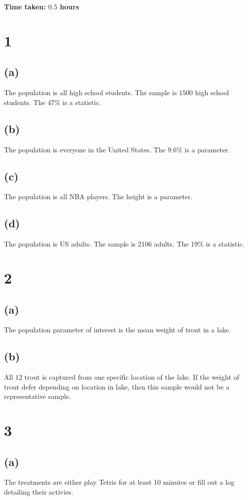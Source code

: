 \documentclass[10pt]{article}
\begin{document}
\noindent
\textbf{Time taken: $0.5$ hours}

\section*{1}

\subsection*{(a)}
The population is all high school students. The sample is $1500$ high school students. The $47\%$ is a statistic.

\subsection*{(b)}
The population is everyone in the United States. The $9.6\%$ is a parameter.

\subsection*{(c)}
The population is all NBA players. The height is a parameter.

\subsection*{(d)}
The population is US adults. The sample is 2106 adults. The $19\%$ is a statistic.

\section*{2}
\subsection*{(a)}
The population parameter of interest is the mean weight of trout in a lake.
\subsection*{(b)}
All $12$ trout is captured from one specific location of the lake. If the weight of trout defer depending on location in lake, then this sample would not be a representative sample.

\section*{3}

\subsection*{(a)}
The treatments are either play Tetris for at least 10 minutes or fill out a log detailing their activies.
\end{document}
